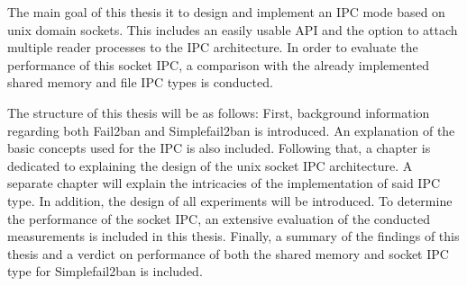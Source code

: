 The main goal of this thesis it to design and implement an \ac{IPC} mode based on unix domain sockets.
This includes an easily usable \ac{API} and the option to attach multiple reader processes to the \ac{IPC} architecture.
In order to evaluate the performance of this socket \ac{IPC}, a comparison with the already implemented shared memory and file \ac{IPC} types is conducted.

The structure of this thesis will be as follows:
First, background information regarding both Fail2ban and Simplefail2ban is introduced.
An explanation of the basic concepts used for the \ac{IPC} is also included.
Following that, a chapter is dedicated to explaining the design of the unix socket \ac{IPC} architecture.
A separate chapter will explain the intricacies of the implementation of said \ac{IPC} type.
In addition, the design of all experiments will be introduced.
To determine the performance of the socket \ac{IPC}, an extensive evaluation of the conducted measurements is included in this thesis.
Finally, a summary of the findings of this thesis and a verdict on performance of both the shared memory and socket \ac{IPC} type for Simplefail2ban is included.